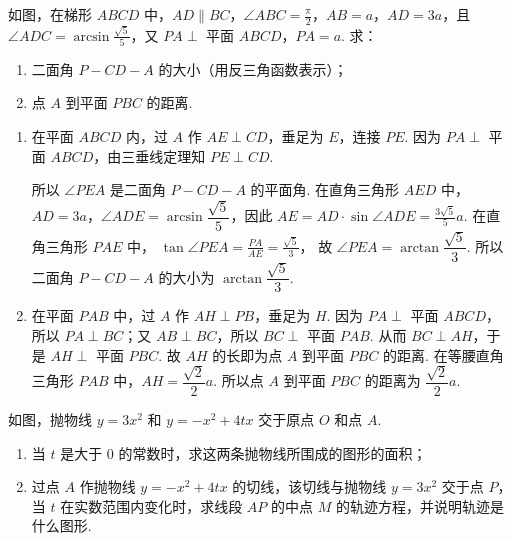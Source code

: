 \documentclass[UTF8,a4paper,oneside,11pt]{ctexbook}
\begin{document}
\begin{problem}
如图，在梯形 \(ABCD\) 中，\(AD \parallel BC\)，\(\angle ABC = \frac{\pi}{2}\)，\(AB = a\)，\(AD = 3a\)，且 \(\angle ADC = \arcsin \frac{\sqrt{5}}{5}\)，又 \(PA \perp\) 平面 \(ABCD\)，\(PA = a\). 求：

\begin{enumerate}
\item 二面角 \(P - CD - A\) 的大小（用反三角函数表示）；
\item 点 \(A\) 到平面 \(PBC\) 的距离.
\end{enumerate}

\end{problem}

\begin{solution}

\begin{enumerate}
\item 在平面 \(ABCD\) 内，过 \(A\) 作 \(AE \perp CD\)，垂足为 \(E\)，连接 \(PE\). 因为 \(PA \perp\) 平面 \(ABCD\)，由三垂线定理知 \(PE \perp CD\).

所以 \(\angle PEA\) 是二面角 \(P - CD - A\) 的平面角.
在直角三角形 \(AED\) 中，\(AD = 3a\)，\(\angle ADE = \arcsin \dfrac{\sqrt{5}}{5}\)，因此
\(AE = AD \cdot \sin \angle ADE = \frac{3\sqrt{5}}{5}a\).
在直角三角形 \(PAE\) 中，
\(\tan \angle PEA = \frac{PA}{AE} = \frac{\sqrt{5}}{3}\)，
故 \(\angle PEA = \arctan \dfrac{\sqrt{5}}{3}\).
所以二面角 \(P - CD - A\) 的大小为 \(\arctan \dfrac{\sqrt{5}}{3}\).

\item 在平面 \(PAB\) 中，过 \(A\) 作 \(AH \perp PB\)，垂足为 \(H\). 因为 \(PA \perp\) 平面 \(ABCD\)，所以 \(PA \perp BC\)；又 \(AB \perp BC\)，所以 \(BC \perp\) 平面 \(PAB\). 从而 \(BC \perp AH\)，于是 \(AH \perp\) 平面 \(PBC\).
故 \(AH\) 的长即为点 \(A\) 到平面 \(PBC\) 的距离.
在等腰直角三角形 \(PAB\) 中，\(AH = \dfrac{\sqrt{2}}{2}a\).
所以点 \(A\) 到平面 \(PBC\) 的距离为 \(\dfrac{\sqrt{2}}{2}a\).
\end{enumerate}
\end{solution}

\begin{problem}
如图，抛物线 \(y = 3x^2\) 和 \(y = -x^2 + 4tx\) 交于原点 \(O\) 和点 \(A\).

\begin{enumerate}
\item 当 \(t\) 是大于 \(0\) 的常数时，求这两条抛物线所围成的图形的面积；
\item 过点 \(A\) 作抛物线 \(y = -x^2 + 4tx\) 的切线，该切线与抛物线 \(y = 3x^2\) 交于点 \(P\)，当 \(t\) 在实数范围内变化时，求线段 \(AP\) 的中点 \(M\) 的轨迹方程，并说明轨迹是什么图形.
\end{enumerate}

\end{problem}
\end{document}
